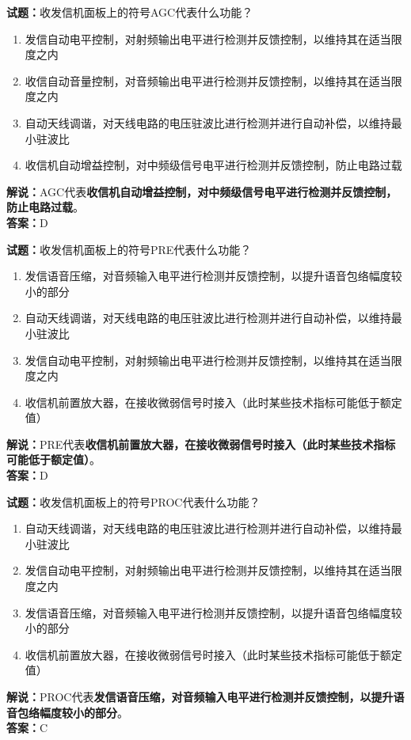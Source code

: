 \documentclass{ctexbook}
\begin{document}
\bigskip


\noindent\textbf{试题：}收发信机面板上的符号AGC代表什么功能？
\begin{enumerate}[leftmargin=3em]
\item 发信自动电平控制，对射频输出电平进行检测并反馈控制，以维持其在适当限度之内
\item 收信自动音量控制，对音频输出电平进行检测并反馈控制，以维持其在适当限度之内
\item 自动天线调谐，对天线电路的电压驻波比进行检测并进行自动补偿，以维持最小驻波比
\item 收信机自动增益控制，对中频级信号电平进行检测并反馈控制，防止电路过载
\end{enumerate}
\noindent\textbf{解说：}AGC代表\textbf{收信机自动增益控制，对中频级信号电平进行检测并反馈控制，防止电路过载}。\\\noindent\textbf{答案：}D



\bigskip


\noindent\textbf{试题：}收发信机面板上的符号PRE代表什么功能？
\begin{enumerate}[leftmargin=3em]
\item 发信语音压缩，对音频输入电平进行检测并反馈控制，以提升语音包络幅度较小的部分
\item 自动天线调谐，对天线电路的电压驻波比进行检测并进行自动补偿，以维持最小驻波比
\item 发信自动电平控制，对射频输出电平进行检测并反馈控制，以维持其在适当限度之内
\item 收信机前置放大器，在接收微弱信号时接入（此时某些技术指标可能低于额定值）
\end{enumerate}
\noindent\textbf{解说：}PRE代表\textbf{收信机前置放大器，在接收微弱信号时接入（此时某些技术指标可能低于额定值）}。\\\noindent\textbf{答案：}D


\bigskip


\noindent\textbf{试题：}收发信机面板上的符号PROC代表什么功能？
\begin{enumerate}[leftmargin=3em]
\item 自动天线调谐，对天线电路的电压驻波比进行检测并进行自动补偿，以维持最小驻波比
\item 发信自动电平控制，对射频输出电平进行检测并反馈控制，以维持其在适当限度之内
\item 发信语音压缩，对音频输入电平进行检测并反馈控制，以提升语音包络幅度较小的部分
\item 收信机前置放大器，在接收微弱信号时接入（此时某些技术指标可能低于额定值）
\end{enumerate}
\noindent\textbf{解说：}PROC代表\textbf{发信语音压缩，对音频输入电平进行检测并反馈控制，以提升语音包络幅度较小的部分}。\\\noindent\textbf{答案：}C
\end{document}
